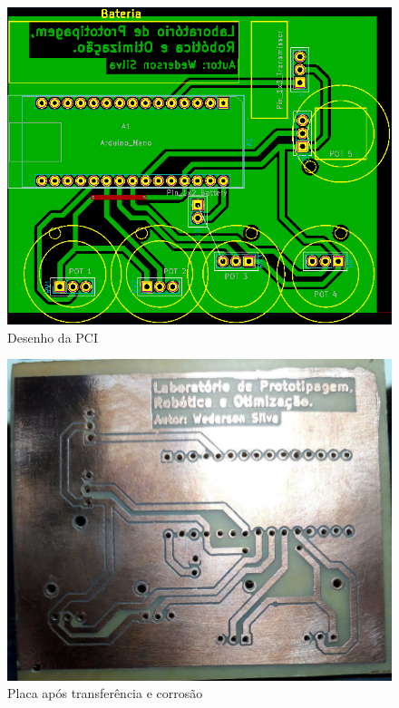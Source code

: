 \documentclass[
	12pt,				%
	openright,			%
	oneside,			%
	a4paper,			%
	english,			%
	brazil				%
	]{abntex2}
\begin{document}
		\begin{figure}[h!]
			\centering
  		\includegraphics[scale=0.5]{./figures/PCB-glove-module1.png}
			\caption{Desenho da PCI}
  		\label{Fig:PCB-glove-module1}
		\end{figure}

		\begin{figure}[h!]
			\centering
  		\includegraphics[scale=0.3]{./figures/phenolic-glove-module1.jpg}
			\caption{Placa após transferência e corrosão}
  		\label{Fig:phenolic-glove-module1}
		\end{figure}
\end{document}
